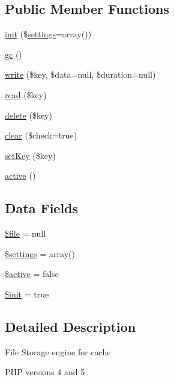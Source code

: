 \subsection*{Public Member Functions}
\begin{DoxyCompactItemize}
\item 
\hyperlink{class_cache_file_add47463221d657541f10f2ca5ec218d8}{init} (\$\hyperlink{class_cache_engine_ad7354383714c6ae99d6ee1bfb95ab49f}{settings}=array())
\item 
\hyperlink{class_cache_file_a14ff7ef4b198ff14884dd8c564264ca3}{gc} ()
\item 
\hyperlink{class_cache_file_ae9d734643a0996053646f956936b9e4d}{write} (\$key, \$data=null, \$duration=null)
\item 
\hyperlink{class_cache_file_a4c50c958c469c08bba0c0ccb710ca8af}{read} (\$key)
\item 
\hyperlink{class_cache_file_aa74a2edd6f3cbb5c5353f7faa97b6d70}{delete} (\$key)
\item 
\hyperlink{class_cache_file_aba34e2af7d036451ec10298cd9707dbd}{clear} (\$check=true)
\item 
\hyperlink{class_cache_file_a9afc10d017d5c65d3e6a941f65cf1904}{set\-Key} (\$key)
\item 
\hyperlink{class_cache_file_a321820072e1a9250bd34a5a5ffe63ca6}{active} ()
\end{DoxyCompactItemize}
\subsection*{Data Fields}
\begin{DoxyCompactItemize}
\item 
\hyperlink{class_cache_file_aa1bfbd27060176201b271918dff57e8f}{\$file} = null
\item 
\hyperlink{class_cache_file_ac7c3353107070daa85f641882931b358}{\$settings} = array()
\item 
\hyperlink{class_cache_file_aacd1fa47b7ea59451aff98beca4360ae}{\$active} = false
\item 
\hyperlink{class_cache_file_a8834b0851b05d161c207a7d2e5dca9bd}{\$init} = true
\end{DoxyCompactItemize}


\subsection{Detailed Description}
File Storage engine for cache

P\-H\-P versions 4 and 5

